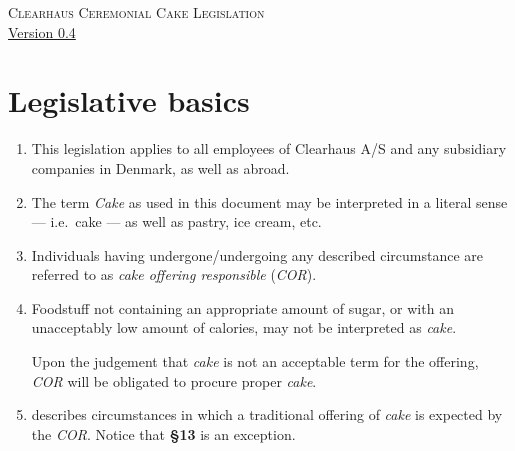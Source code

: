 \documentclass[a4paper, oneside, article]{memoir}
\newcounter{tbc}
\begin{document}
\thispagestyle{empty} %
\begin{center}
  \textsc{\huge Clearhaus Ceremonial Cake Legislation}
  \\
  {\footnotesize \href{https://semver.org/}{Version 0.4}}
\end{center}

\chapter{Legislative basics}

\begin{enumerate}[§ 1]
  \item This legislation applies to all employees of Clearhaus {\small A/S} and
    any subsidiary companies in Denmark, as well as abroad.

  \item The term \emph{Cake} as used in this document may be
    interpreted in a literal sense --- i.e.\ cake --- as well as pastry, ice
    cream, etc.

  \item Individuals having undergone/undergoing any described circumstance are
    referred to as \emph{cake offering responsible} (\emph{COR}).

  \item Foodstuff not containing an appropriate amount of sugar, or with an
    unacceptably low amount of calories, may not be interpreted as
    \emph{cake}.

    Upon the judgement that \emph{cake} is not an acceptable term for the
    offering, \emph{COR} will be obligated to procure proper \emph{cake}.

  \item {} describes circumstances in which a traditional
    offering of \emph{cake} is expected by the \emph{COR}. Notice that
    \textbf{§13} is an exception.

  \setcounter{tbc}{\value{enumi}}
\end{enumerate}
\end{document}
